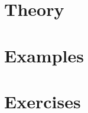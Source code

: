 



\frontmatter
   \pagestyle{empty}
   
   

   \newpage \pagestyle{fancy} \setcounter{page}{1}
   \tableofcontents

   
   
\mainmatter
   \part{Theory}
       
       
       
       
       
   \part{Examples}
   
   \part{Exercises}

\backmatter
    
    \printindex
    

